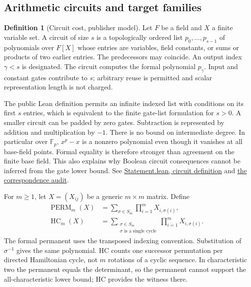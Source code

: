 \documentclass[11pt,letterpaper]{article}
\theoremstyle{definition}\newtheorem{definition}[theorem]{Definition}\newtheorem{example}[theorem]{Example}
\theoremstyle{remark}\newtheorem{remark}[theorem]{Remark}
\newcommand{\HC}{\operatorname{HC}}
\newcommand{\Perm}{\operatorname{PERM}}
\newcommand{\F}{\mathbb{F}}
\newcommand{\pub}[3]{\href{https://github.com/anthropics/formal-math/blob/11b6c7e3c927df2658f513b6b68ea7f8929c62c5/vp-vnp/#1\#L#2}{#3}}
\newcommand{\aud}[2]{\href{https://github.com/nousentllc/VP-VNP-Review/blob/567303d0bcf4f9d54390437b137752446e58ccd6/#1}{#2}}
\begin{document}
\subsection{Arithmetic circuits and target families}
\begin{definition}[Circuit cost, publisher model]
Let $F$ be a field and $X$ a finite variable set. A circuit of size $s$ is a topologically ordered list $p_0,\ldots,p_{s-1}$ of polynomials over $F[X]$ whose entries are variables, field constants, or sums or products of two earlier entries. The predecessors may coincide. An output index $\gamma<s$ is designated. The circuit computes the formal polynomial $p_\gamma$. Input and constant gates contribute to $s$; arbitrary reuse is permitted and scalar representation length is not charged.
\end{definition}
The public Lean definition permits an infinite indexed list with conditions on its first $s$ entries, which is equivalent to the finite gate-list formulation for $s>0$. A smaller circuit can be padded by zero gates. Subtraction is represented by addition and multiplication by $-1$. There is no bound on intermediate degree. In particular over $\F_p$, $x^p-x$ is a nonzero polynomial even though it vanishes at all base-field points. Formal equality is therefore stronger than agreement on the finite base field. This also explains why Boolean circuit consequences cannot be inferred from the gate lower bound. See \pub{Statement.lean}{23}{Statement.lean, circuit definition} and \aud{passes/statement-correspondence.md}{the correspondence audit}.

For $m\ge1$, let $X=(X_{ij})$ be a generic $m\times m$ matrix. Define
\begin{align}
\Perm_m(X)&=\sum_{\sigma\in S_m}\prod_{i=1}^m X_{i,\sigma(i)},\\
\HC_m(X)&=\sum_{\substack{\sigma\in S_m\\\sigma\text{ is a single cycle}}}\prod_{i=1}^m X_{i,\sigma(i)}.
\end{align}
The formal permanent uses the transposed indexing convention. Substitution of $\sigma^{-1}$ gives the same polynomial. HC counts one successor permutation per directed Hamiltonian cycle, not $m$ rotations of a cyclic sequence. In characteristic two the permanent equals the determinant, so the permanent cannot support the all-characteristic lower bound; HC provides the witness there.
\end{document}
